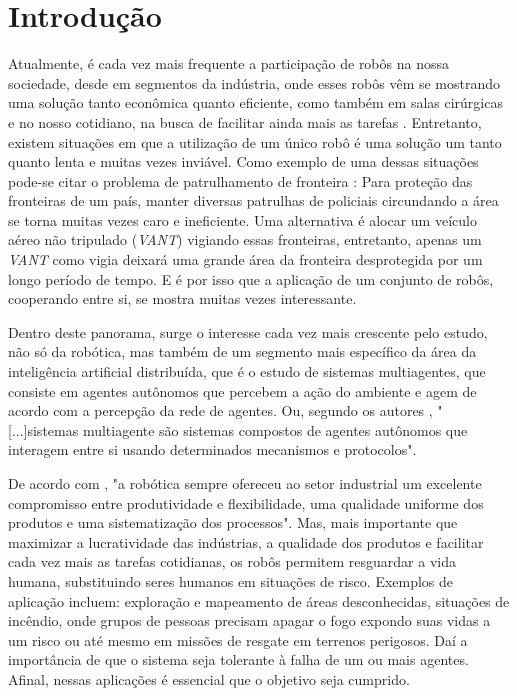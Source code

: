 %
%

\chapter{Introdução}\label{chap:introducao}
Atualmente, é cada vez mais frequente a participação de robôs na nossa sociedade, desde em segmentos da indústria, onde esses robôs vêm se mostrando uma solução tanto econômica quanto eficiente, como também em salas cirúrgicas e no nosso cotidiano, na busca de facilitar ainda mais as tarefas \cite{HCWSNX02,CMHL08}. Entretanto, existem situações em que a utilização de um único robô é uma solução um tanto quanto lenta e muitas vezes inviável. Como exemplo de uma dessas situações pode-se citar o problema de patrulhamento de fronteira \cite{CMAJJBC08} : Para proteção das fronteiras de um país, manter diversas patrulhas de policiais circundando a área se torna muitas vezes caro e ineficiente. Uma alternativa é alocar um veículo aéreo não tripulado (\emph{VANT}) vigiando essas fronteiras, entretanto, apenas um \emph{VANT} como vigia deixará uma grande área da fronteira desprotegida por um longo período de tempo. E é por isso que a aplicação de um conjunto de robôs, cooperando entre si, se mostra muitas vezes interessante.  

Dentro deste panorama, surge o interesse cada vez mais crescente pelo estudo, não só da robótica, mas também de um segmento mais específico da área da inteligência artificial distribuída, que é o estudo de sistemas multiagentes, que consiste em agentes autônomos que percebem a ação do ambiente e agem de acordo com a percepção da rede de agentes. Ou, segundo os autores , "[...]sistemas multiagente são sistemas compostos de agentes autônomos que interagem entre si usando determinados mecanismos e protocolos". %

De acordo com  , "a robótica sempre ofereceu ao setor industrial um excelente compromisso entre produtividade e flexibilidade, uma qualidade uniforme dos produtos e uma sistematização dos processos". Mas, mais importante que maximizar a lucratividade das indústrias, a qualidade dos produtos e facilitar cada vez mais as tarefas cotidianas, os robôs permitem resguardar a vida humana, substituindo seres humanos em situações de risco. Exemplos de aplicação incluem: exploração e mapeamento de áreas desconhecidas, situações de incêndio, onde grupos de pessoas precisam apagar o fogo expondo suas vidas a um risco ou até mesmo em missões de resgate em terrenos perigosos. Daí a importância de que o sistema seja tolerante à falha de um ou mais agentes. Afinal, nessas aplicações é essencial que o objetivo seja cumprido.

